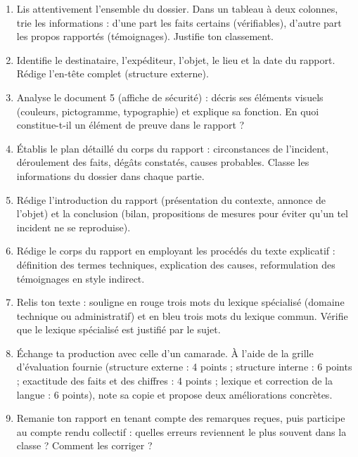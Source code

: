 \documentclass[11pt]{article}
\newcounter{popsec}
\newcounter{popsub}
\newcommand{\courssub}[1]{%
  \stepcounter{popsub}%
  \par\vspace{9pt}\noindent{\popxbold\fontsize{11.5}{13}\selectfont\color{popink}{\color{poporange}\thepopsec.\thepopsub}\hspace{6pt}#1}\par\nopagebreak\vspace{4pt}
}
\begin{document}
\begin{enumerate}
\item Lis attentivement l'ensemble du dossier. Dans un tableau à deux colonnes, trie les informations : d'une part les faits certains (vérifiables), d'autre part les propos rapportés (témoignages). Justifie ton classement.
\item Identifie le destinataire, l'expéditeur, l'objet, le lieu et la date du rapport. Rédige l'en-tête complet (structure externe).
\item Analyse le document 5 (affiche de sécurité) : décris ses éléments visuels (couleurs, pictogramme, typographie) et explique sa fonction. En quoi constitue-t-il un élément de preuve dans le rapport ?
\item Établis le plan détaillé du corps du rapport : circonstances de l'incident, déroulement des faits, dégâts constatés, causes probables. Classe les informations du dossier dans chaque partie.
\item Rédige l'introduction du rapport (présentation du contexte, annonce de l'objet) et la conclusion (bilan, propositions de mesures pour éviter qu'un tel incident ne se reproduise).
\item Rédige le corps du rapport en employant les procédés du texte explicatif : définition des termes techniques, explication des causes, reformulation des témoignages en style indirect.
\item Relis ton texte : souligne en rouge trois mots du lexique spécialisé (domaine technique ou administratif) et en bleu trois mots du lexique commun. Vérifie que le lexique spécialisé est justifié par le sujet.
\item Échange ta production avec celle d'un camarade. À l'aide de la grille d'évaluation fournie (structure externe : 4 points ; structure interne : 6 points ; exactitude des faits et des chiffres : 4 points ; lexique et correction de la langue : 6 points), note sa copie et propose deux améliorations concrètes.
\item Remanie ton rapport en tenant compte des remarques reçues, puis participe au compte rendu collectif : quelles erreurs reviennent le plus souvent dans la classe ? Comment les corriger ?
\end{enumerate}

\courssub{Ressources à mobiliser}
\end{document}
